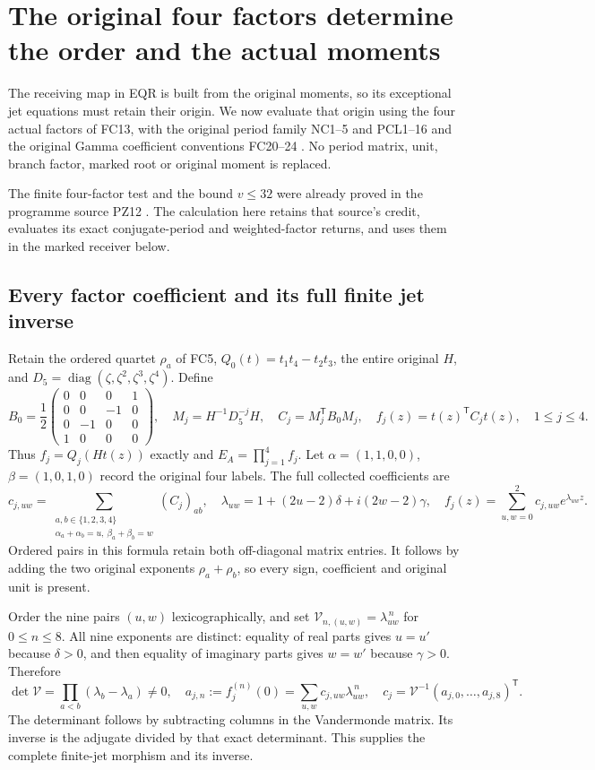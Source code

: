 \section{The original four factors determine the order and the actual moments}
The receiving map in EQR is built from the original moments, so its
exceptional jet equations must retain their origin. We now evaluate
that origin using the four actual factors of FC13, with the original
period family NC1--5 and PCL1--16 \cite{NC,Cumulative,PCLOriginal} and the original Gamma
coefficient conventions FC20--24 \cite{WCF}. No period matrix, unit,
branch factor, marked root or original moment is replaced.

The finite four-factor test and the bound $v\le32$ were already
proved in the programme source PZ12 \cite{PeriodZeroOriginal}. The
calculation here retains that source's credit, evaluates its exact
conjugate-period and weighted-factor returns, and uses them in the
marked receiver below.

\subsection{Every factor coefficient and its full finite jet inverse}
Retain the ordered quartet $\rho_a$ of FC5, $Q_0(t)=t_1t_4-t_2t_3$,
the entire original $H$, and $D_5=\operatorname{diag}(\zeta,\zeta^2,
\zeta^3,\zeta^4)$. Define
\[
 B_0=\frac12\begin{pmatrix}0&0&0&1\\0&0&-1&0\\
 0&-1&0&0\\1&0&0&0\end{pmatrix},\quad
 M_j=H^{-1}D_5^{-j}H,\quad C_j=M_j^{\mathsf T}B_0M_j,
 \quad f_j(z)=t(z)^{\mathsf T}C_jt(z),\quad 1\le j\le4.
 \tag{OFM1}
\]
Thus $f_j=Q_j(Ht(z))$ exactly and $E_A=\prod_{j=1}^4f_j$.
Let $\alpha=(1,1,0,0)$, $\beta=(1,0,1,0)$ record the original
four labels. The full collected coefficients are
\[
 c_{j,uw}=\sum_{\substack{a,b\in\{1,2,3,4\}\\
       \alpha_a+\alpha_b=u,\ \beta_a+\beta_b=w}}(C_j)_{ab},
 \quad \lambda_{uw}=1+(2u-2)\delta+i(2w-2)\gamma,
 \quad f_j(z)=\sum_{u,w=0}^2c_{j,uw}e^{\lambda_{uw}z}.
 \tag{OFM2}
\]
Ordered pairs in this formula retain both off-diagonal matrix entries.
It follows by adding the two original exponents $\rho_a+\rho_b$,
so every sign, coefficient and original unit is present.

Order the nine pairs $(u,w)$ lexicographically, and set
$\mathcal V_{n,(u,w)}=\lambda_{uw}^{\,n}$ for $0\le n\le8$.
All nine exponents are distinct: equality of real parts gives $u=u'$
because $\delta>0$, and then equality of imaginary parts gives $w=w'$
because $\gamma>0$. Therefore
\[
 \det\mathcal V=\prod_{a<b}(\lambda_b-\lambda_a)\ne0,
 \quad a_{j,n}:=f_j^{(n)}(0)=\sum_{u,w}c_{j,uw}\lambda_{uw}^{\,n},
 \quad c_j=\mathcal V^{-1}(a_{j,0},\ldots,a_{j,8})^{\mathsf T}.
 \tag{OFM3}
\]
The determinant follows by subtracting columns in the Vandermonde
matrix. Its inverse is the adjugate divided by that exact determinant.
This supplies the complete finite-jet morphism and its inverse.

